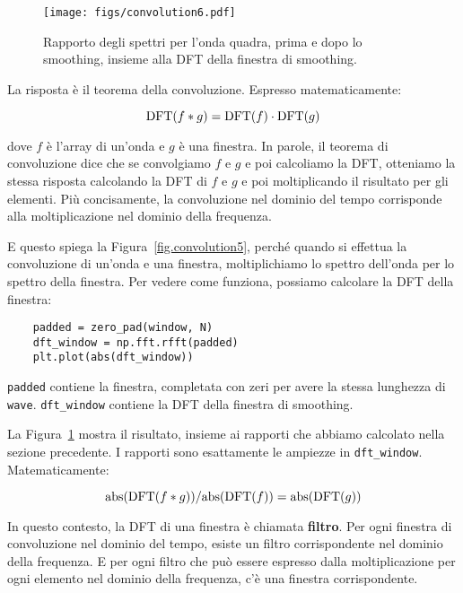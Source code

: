 \documentclass[12pt,a4paper]{book}
\begin{document}
\begin{figure} 

\centerline{\texttt{[image: figs/convolution6.pdf]}} \caption{Rapporto degli spettri per l'onda quadra, prima e dopo lo smoothing, insieme alla DFT della finestra di smoothing.} \label{fig.convolution6} \end{figure} 

\newcommand{\DFT}{\mathrm{DFT}} \newcommand{\IDFT}{\mathrm{IDFT}}

La risposta è il teorema della convoluzione. Espresso matematicamente:

%
\[ \DFT(f \conv g) = \DFT(f) \cdot \DFT(g) \] 

%
dove $f$ è l'array di un'onda e $g$ è una finestra. In parole, il teorema di convoluzione dice che se convolgiamo $f$ e $g$ e poi calcoliamo la DFT, otteniamo la stessa risposta calcolando la DFT di $f$ e $g$ e poi moltiplicando il risultato per gli elementi. Più concisamente, la convoluzione nel dominio del tempo corrisponde alla moltiplicazione nel dominio della frequenza.

E questo spiega la Figura~\ref{fig.convolution5}, perché quando si effettua la convoluzione di un'onda e una finestra, moltiplichiamo lo spettro dell'onda per lo spettro della finestra. Per vedere come funziona, possiamo calcolare la DFT della finestra:

\begin{verbatim} 
    padded = zero_pad(window, N)
    dft_window = np.fft.rfft(padded)
    plt.plot(abs(dft_window))
 \end{verbatim} 

{\tt padded} contiene la finestra, completata con zeri per avere la stessa lunghezza di {\tt wave}. \verb"dft_window" contiene la DFT della finestra di smoothing.

\newcommand{\abs}{\mathrm{abs}}

La Figura~\ref{fig.convolution6} mostra il risultato, insieme ai rapporti che abbiamo calcolato nella sezione precedente. I rapporti sono esattamente le ampiezze in \verb"dft_window". Matematicamente:

%
\[ \abs(\DFT(f \conv g)) / \abs(\DFT(f)) = \abs(\DFT(g)) \] 

%
In questo contesto, la DFT di una finestra è chiamata {\bf filtro}. Per ogni finestra di convoluzione nel dominio del tempo, esiste un filtro corrispondente nel dominio della frequenza. E per ogni filtro che può essere espresso dalla moltiplicazione per ogni elemento nel dominio della frequenza, c'è una finestra corrispondente.
\end{document}
